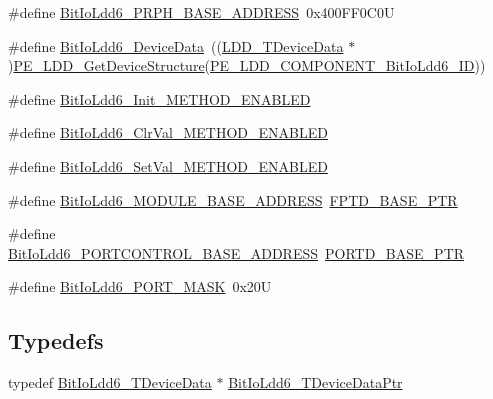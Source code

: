 \begin{DoxyCompactItemize}
\item 
\#define \hyperlink{group___bit_io_ldd6__module_gab86b554f6c365641f4d947c19d70e30e}{Bit\+Io\+Ldd6\+\_\+\+P\+R\+P\+H\+\_\+\+B\+A\+S\+E\+\_\+\+A\+D\+D\+R\+E\+SS}~0x400\+F\+F0\+C0U
\item 
\#define \hyperlink{group___bit_io_ldd6__module_ga7a3520a4a3b9bdfeffab98814fc6a6f2}{Bit\+Io\+Ldd6\+\_\+\+Device\+Data}~((\hyperlink{group___p_e___types__module_gac5cf1362f1f0e3a2ce71b1bf2276d091}{L\+D\+D\+\_\+\+T\+Device\+Data} $\ast$)\hyperlink{group___p_e___types__module_gaa1c23d559daef5bcd3327ca83fb56f5a}{P\+E\+\_\+\+L\+D\+D\+\_\+\+Get\+Device\+Structure}(\hyperlink{group___p_e___types__module_ga2d806b7e899b14fed2b419c473dd9c02}{P\+E\+\_\+\+L\+D\+D\+\_\+\+C\+O\+M\+P\+O\+N\+E\+N\+T\+\_\+\+Bit\+Io\+Ldd6\+\_\+\+ID}))
\item 
\#define \hyperlink{group___bit_io_ldd6__module_gafc61e292074c00b795b0dce94593de66}{Bit\+Io\+Ldd6\+\_\+\+Init\+\_\+\+M\+E\+T\+H\+O\+D\+\_\+\+E\+N\+A\+B\+L\+ED}
\item 
\#define \hyperlink{group___bit_io_ldd6__module_ga371dbe9a39459b0c034d3dec998a2d14}{Bit\+Io\+Ldd6\+\_\+\+Clr\+Val\+\_\+\+M\+E\+T\+H\+O\+D\+\_\+\+E\+N\+A\+B\+L\+ED}
\item 
\#define \hyperlink{group___bit_io_ldd6__module_ga4a22c8328f4633d7e0501fba380bbd9a}{Bit\+Io\+Ldd6\+\_\+\+Set\+Val\+\_\+\+M\+E\+T\+H\+O\+D\+\_\+\+E\+N\+A\+B\+L\+ED}
\item 
\#define \hyperlink{group___bit_io_ldd6__module_ga83ebef84d5d8d1276824e0a72050e7c5}{Bit\+Io\+Ldd6\+\_\+\+M\+O\+D\+U\+L\+E\+\_\+\+B\+A\+S\+E\+\_\+\+A\+D\+D\+R\+E\+SS}~\hyperlink{group___backward___compatibility___symbols_gabaff6b055edb9ba703415d0473b92ca8}{F\+P\+T\+D\+\_\+\+B\+A\+S\+E\+\_\+\+P\+TR}
\item 
\#define \hyperlink{group___bit_io_ldd6__module_ga4b025a9c0573a24694f7a536527cdde8}{Bit\+Io\+Ldd6\+\_\+\+P\+O\+R\+T\+C\+O\+N\+T\+R\+O\+L\+\_\+\+B\+A\+S\+E\+\_\+\+A\+D\+D\+R\+E\+SS}~\hyperlink{group___p_o_r_t___peripheral_ga7f5a263751543810ebfdbde278383276}{P\+O\+R\+T\+D\+\_\+\+B\+A\+S\+E\+\_\+\+P\+TR}
\item 
\#define \hyperlink{group___bit_io_ldd6__module_gafa37ffd4835bcf3032562cfb72e181ef}{Bit\+Io\+Ldd6\+\_\+\+P\+O\+R\+T\+\_\+\+M\+A\+SK}~0x20U
\end{DoxyCompactItemize}
\subsection*{Typedefs}
\begin{DoxyCompactItemize}
\item 
typedef \hyperlink{struct_bit_io_ldd6___t_device_data}{Bit\+Io\+Ldd6\+\_\+\+T\+Device\+Data} $\ast$ \hyperlink{group___bit_io_ldd6__module_gac323e30f9c86e0e2acefd4ef43f79bd9}{Bit\+Io\+Ldd6\+\_\+\+T\+Device\+Data\+Ptr}
\end{DoxyCompactItemize}
